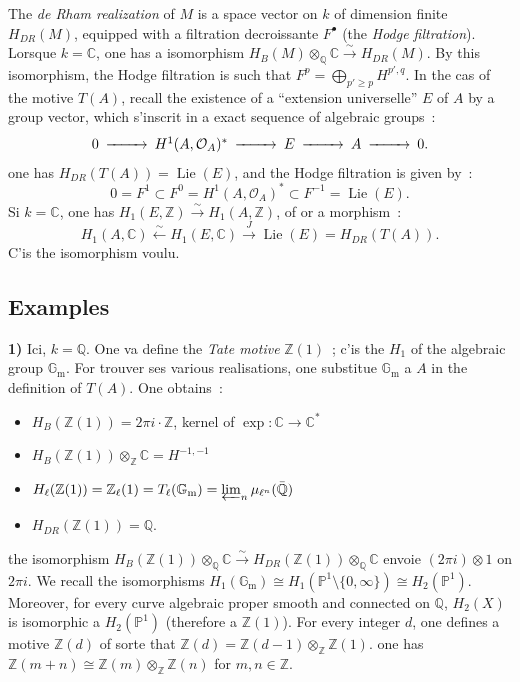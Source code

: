 \documentclass[12pt,a4paper]{article}
\theoremstyle{plain}
\theoremstyle{definition}
\theoremstyle{remark}
\DeclareMathOperator{\Lie}{Lie}
\newcommand{\ZZ}{\mathbb{Z}}
\newcommand{\QQ}{\mathbb{Q}}
\newcommand{\CC}{\mathbb{C}}
\newcommand{\Gm}{\mathbb{G}_\mathrm{m}}
\newcommand{\PP}{\mathbb{P}}
\providecommand{\CC}{\mathbb{C}}
\providecommand{\PP}{\mathbb{P}}
\providecommand{\QQ}{\mathbb{Q}}
\providecommand{\ZZ}{\mathbb{Z}}
\providecommand{\Gm}{\mathbb{G}_{\mathrm m}}
\providecommand{\Lie}{\operatorname{Lie}}
\begin{document}
The \emph{de Rham realization} of $M$ is a space vector on $k$ of dimension finite $H_{DR}(M)$, equipped with a filtration decroissante $F^\bullet$ (the \emph{Hodge filtration}). Lorsque $k = \CC$, one has a isomorphism $H_B(M) \otimes_\QQ \CC \xrightarrow{\sim} H_{DR}(M)$. By this isomorphism, the Hodge filtration is such that $F^p = \bigoplus_{p' \geq p} H^{p',q}$. In the cas of the motive $T(A)$, recall \cite{Weil2} the existence of a ``extension universelle'' $E$ of $A$ by a group vector, which s'inscrit in a exact sequence of algebraic groups~:
\begin{equation*}
\begin{CD}
0 @>>> H^1(A, \mathcal{O}_A)^* @>>> E @>>> A @>>> 0.
\end{CD}
\end{equation*}
one has $H_{DR}(T(A)) = \Lie(E)$, and the Hodge filtration is given by~:
\[
0 = F^1 \subset F^0 = H^1(A, \mathcal{O}_A)^* \subset F^{-1} = \Lie(E).
\]
Si $k = \CC$, one has $H_1(E, \ZZ) \xrightarrow{\sim} H_1(A, \ZZ)$, of or a morphism~:
\[
H_1(A, \CC) \xleftarrow{\sim} H_1(E, \CC) \xrightarrow{J} \Lie(E) = H_{DR}(T(A)).
\]
C'is the isomorphism voulu.

\subsection*{Examples}

\textbf{1)} Ici, $k = \QQ$. One va define the \emph{Tate motive} $\ZZ(1)$~; c'is the $H_1$ of the algebraic group $\Gm$. For trouver ses various realisations, one substitue $\Gm$ a $A$ in the definition of $T(A)$. One obtains~:
\begin{itemize}[label={--}]
\item $H_B(\ZZ(1)) = 2\pi i \cdot \ZZ$, kernel of $\exp : \CC \to \CC^*$
\item $H_B(\ZZ(1)) \otimes_\ZZ \CC = H^{-1,-1}$
\item $H_\ell(\ZZ(1)) = \ZZ_\ell(1) = T_\ell(\Gm) = \varprojlim_n \mu_{\ell^n}(\bar{\QQ})$
\item $H_{DR}(\ZZ(1)) = \QQ$.
\end{itemize}

the isomorphism $H_B(\ZZ(1)) \otimes_\QQ \CC \xrightarrow{\sim} H_{DR}(\ZZ(1)) \otimes_\QQ \CC$ envoie $(2\pi i) \otimes 1$ on $2\pi i$. We recall the isomorphisms $H_1(\Gm) \cong H_1(\PP^1 \setminus \{0, \infty\}) \cong H_2(\PP^1)$. Moreover, for every curve algebraic proper smooth and connected on $\QQ$, $H_2(X)$ is isomorphic a $H_2(\PP^1)$ (therefore a $\ZZ(1)$). For every integer $d$, one defines a motive $\ZZ(d)$ of sorte that $\ZZ(d) = \ZZ(d-1) \otimes_\ZZ \ZZ(1)$. one has $\ZZ(m+n) \cong \ZZ(m) \otimes_\ZZ \ZZ(n)$ for $m, n \in \ZZ$.
\end{document}
